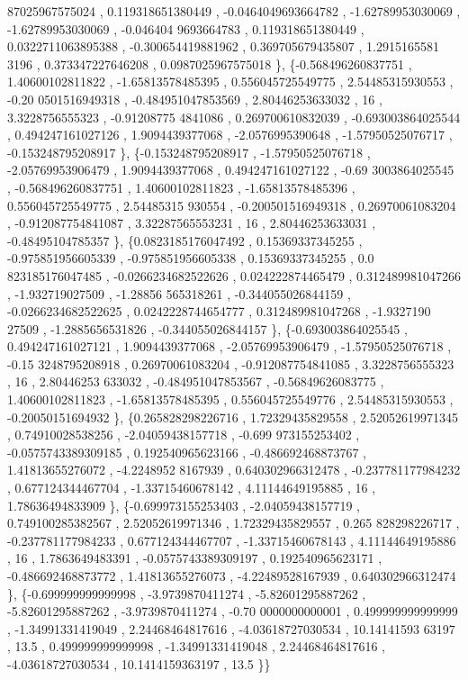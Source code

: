 \begin{DoxyCode}
      87025967575024 , 0.119318651380449 , -0.0464049693664782 , -1.62789953030069 , -1.62789953030069 , -0.046404
      9693664783 , 0.119318651380449 , 0.0322711063895388 , -0.300654419881962 , 0.369705679435807 ,  1.2915165581
      3196 , 0.373347227646208 , 0.0987025967575018 \},
\{-0.568496260837751 ,  1.40600102811822 , -1.65813578485395 , 0.556045725549775 ,  2.54485315930553 , -0.20
      0501516949318 , -0.484951047853569 ,  2.80446253633032 ,                16 ,   3.3228756555323 , -0.91208775
      4841086 , 0.269700610832039 , -0.693003864025544 , 0.494247161027126 ,   1.9094439377068 ,  -2.0576995390648
       , -1.57950525076717 , -0.153248795208917 \},
\{-0.153248795208917 , -1.57950525076718 , -2.05769953906479 ,   1.9094439377068 , 0.494247161027122 , -0.69
      3003864025545 , -0.568496260837751 ,  1.40600102811823 , -1.65813578485396 , 0.556045725549775 ,  2.54485315
      930554 , -0.200501516949318 ,  0.26970061083204 , -0.912087754841087 ,  3.32287565553231 ,                16
       ,  2.80446253633031 , -0.48495104785357 \},
\{0.0823185176047492 ,  0.15369337345255 , -0.975851956605339 , -0.975851956605338 ,  0.15369337345255 , 0.0
      823185176047485 , -0.0266234682522626 , 0.024222874465479 , 0.312489981047266 ,   -1.932719027509 , -1.28856
      565318261 , -0.344055026844159 , -0.0266234682522625 , 0.0242228744654777 , 0.312489981047268 ,   -1.9327190
      27509 ,  -1.2885656531826 , -0.344055026844157 \},
\{-0.693003864025545 , 0.494247161027121 ,   1.9094439377068 , -2.05769953906479 , -1.57950525076718 , -0.15
      3248795208918 ,  0.26970061083204 , -0.912087754841085 ,   3.3228756555323 ,                16 ,  2.80446253
      633032 , -0.484951047853567 , -0.56849626083775 ,  1.40600102811823 , -1.65813578485395 , 0.556045725549776 
      ,  2.54485315930553 , -0.20050151694932 \},
\{0.265828298226716 ,  1.72329435829558 ,  2.52052619971345 ,  0.74910028538256 , -2.04059438157718 , -0.699
      973155253402 , -0.0575743389309185 , 0.192540965623166 , -0.486692468873767 ,  1.41813655276072 , -4.2248952
      8167939 , 0.640302966312478 , -0.237781177984232 , 0.677124344467704 , -1.33715460678142 ,  4.11144649195885
       ,                16 ,  1.78636494833909 \},
\{-0.699973155253403 , -2.04059438157719 , 0.749100285382567 ,  2.52052619971346 ,  1.72329435829557 , 0.265
      828298226717 , -0.237781177984233 , 0.677124344467707 , -1.33715460678143 ,  4.11144649195886 ,             
         16 ,   1.7863649483391 , -0.0575743389309197 , 0.192540965623171 , -0.486692468873772 ,  1.41813655276073
       , -4.22489528167939 , 0.640302966312474 \},
\{-0.699999999999998 ,  -3.9739870411274 , -5.82601295887262 , -5.82601295887262 ,  -3.9739870411274 , -0.70
      0000000000001 , 0.499999999999999 , -1.34991331419049 ,  2.24468464817616 , -4.03618727030534 ,  10.14141593
      63197 ,              13.5 , 0.499999999999998 , -1.34991331419048 ,  2.24468464817616 , -4.03618727030534 , 
       10.1414159363197 ,              13.5 \}\}
\end{DoxyCode}
\mbox{\label{a00518_af8a639c6d56c6c59b53ab16bd5443ad3}} 
